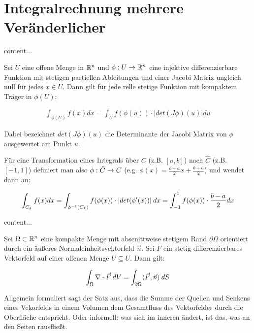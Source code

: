 \pagebreak
	
\section{Integralrechnung mehrere Veränderlicher}

\begin{definition}
	content...
\end{definition}

\begin{satz}
	Sei $U$ eine offene Menge in $\mathbb{R}^n$ und $\phi : U \rightarrow \mathbb{R}^n$ eine injektive differenzierbare Funktion mit stetigen partiellen Ableitungen und einer Jacobi Matrix ungleich null für jedes $x \in U$. Dann gilt für jede relle stetige Funktion mit kompaktem Träger in $\phi(U)$:
	
	\begin{align*}
		\int_{\phi(U)}	 f(x) dx = \int_U f(\phi(u)) \cdot |det(J \phi)(u)| du
 	\end{align*}
 	
 	Dabei bezeichnet $det(J \phi)(u)$ die Determinante der Jacobi Matrix von $\phi$ ausgewertet am Punkt $u$.
 	
 	Für eine Transformation eines Integrals über $C$ (z.B. $[a,b]$) nach $\hat{C}$ (z.B. $[-1,1]$) definiert man also $\phi : \hat{C} \rightarrow C$ (e.g. $\phi(x) = \frac{b - a}{2}x + \frac{b + a}{2}$) und wendet dann an:
 	
 	\begin{align*}
 		\int_{C_k} f(x) dx = \int_{\phi^{-1}(C_k)} f(\phi(x)) \cdot |det(\phi'(x))| \medspace dx = \int_{-1}^{1} f(\phi(x)) \cdot \frac{b - a}{2} dx
 	\end{align*}
	
\end{satz}

\begin{satz}
	content...
\end{satz}

\begin{satz}
	Sei $\Omega \subset \mathbb{R}^n$ eine kompakte Menge mit abscnittweise stetigem Rand $\partial \Omega$ orientiert durch ein äußeres Normaleinheitsvektorfeld $\vec{n}$. Sei $F$ ein stetig differenzierbares Vektorfeld auf einer offenen Menge $U \subseteq U$. Dann gilt:
	
	\begin{align*}
		\int_\Omega \nabla \cdot \vec{F} \medspace dV = \int_{\partial \Omega} \langle \vec{F}, \vec{n} \rangle \medspace dS
	\end{align*}
	
	Allgemein formuliert sagt der Satz aus, dass die Summe der Quellen und Senkens eines Vekorfelds in einem Volumen dem Gesamtfluss des Vektorfeldes durch die Oberfläche entspricht.
	Oder informell: was sich im inneren ändert, ist das, was an den Seiten rausfließt.	
	
\end{satz}

